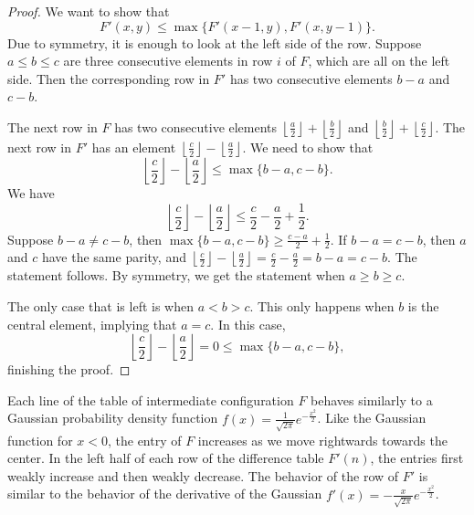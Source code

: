\documentclass[11pt]{article}
\theoremstyle{definition}
\theoremstyle{remark}
\newcommand{\floor}[1]{\left\lfloor #1 \right\rfloor}
\begin{document}
\begin{proof}
We want to show that 
\[F'(x,y) \leq \max\{F'(x-1,y),F'(x,y-1)\}.\]
Due to symmetry, it is enough to look at the left side of the row. Suppose $a \le b \le c$ are three consecutive elements in row $i$ of $F$, which are all on the left side. Then the corresponding row in $F'$ has two consecutive elements $b-a$ and $c-b$.
    
The next row in $F$ has two consecutive elements $\floor{\frac{a}{2}} + \floor{\frac{b}{2}}$ and $\floor{\frac{b}{2}} + \floor{\frac{c}{2}}$. The next row in $F'$ has an element $\floor{\frac{c}{2}} - \floor{\frac{a}{2}}$. We need to show that
    \[\floor{\frac{c}{2}} - \floor{\frac{a}{2}} \le \max\{b-a,c-b\}.\]
    We have
    \[\floor{\frac{c}{2}} - \floor{\frac{a}{2}} \le \frac{c}{2} - \frac{a}{2} + \frac{1}{2}.\]
    Suppose $b-a \ne c-b$, then $\max\{b-a,c-b\} \ge \frac{c-a}{2} + \frac{1}{2}$. If $b-a = c-b$, then $a$ and $c$ have the same parity, and $\floor{\frac{c}{2}} - \floor{\frac{a}{2}} = \frac{c}{2} - \frac{a}{2} = b-a = c-b$. The statement follows. By symmetry, we get the statement when $a \ge b \ge c$.
    
    The only case that is left is when $a < b > c$. This only happens when $b$ is the central element, implying that $a = c$. In this case, 
    \[\floor{\frac{c}{2}} - \floor{\frac{a}{2}} = 0 \le \max\{b-a,c-b\},\]
    finishing the proof.
\end{proof}


Each line of the table of intermediate configuration $F$ behaves similarly to a Gaussian probability density function $f(x) = \frac{1}{\sqrt{2\pi}}e^{-\frac{x^2}{2}}$. Like the Gaussian function for $x < 0$, the entry of $F$ increases as we move rightwards towards the center. In the left half of each row of the difference table $F'(n)$, the entries first weakly increase and then weakly decrease. The behavior of the row of $F'$ is similar to the behavior of the derivative of the Gaussian $f'(x) = -\frac{x}{\sqrt{2\pi}}e^{-\frac{x^2}{2}}$.
\end{document}
